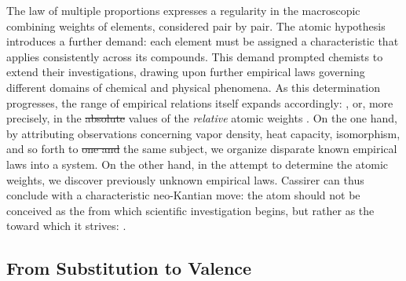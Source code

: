 \documentclass[submitted,12pt]{article}
\providecommand{\DIFadd}[1]{{\protect\color{blue}\uwave{#1}}} %
\providecommand{\DIFdel}[1]{{\protect\color{red}\sout{#1}}}                      %
\providecommand{\DIFaddbegin}{} %
\providecommand{\DIFaddend}{} %
\providecommand{\DIFdelbegin}{} %
\providecommand{\DIFdelend}{} %
\begin{document}
The law of multiple proportions expresses a regularity in the macroscopic combining weights of elements, considered pair by pair. The atomic hypothesis introduces a further demand: each element must be assigned a characteristic  that applies consistently across its compounds. This demand prompted chemists to extend their investigations, drawing upon further empirical laws governing different domains of chemical and physical phenomena. As this determination progresses, the range of empirical relations itself expands accordingly: \DIFdelbegin %
\DIFdelend \DIFaddbegin {}\DIFaddend , or, more precisely, in the \DIFdelbegin \DIFdel{absolute }\DIFdelend \DIFaddbegin \DIFadd{determinate }\DIFaddend values of the \emph{relative} atomic weights . On the one hand, by attributing observations concerning vapor density, heat capacity, isomorphism, and so forth to \DIFdelbegin \DIFdel{one and }\DIFdelend the same subject, we organize disparate known empirical laws into a system. On the other hand, in the attempt to determine the atomic weights, we discover previously unknown empirical laws. Cassirer can thus conclude with a characteristic neo-Kantian move: the atom should not be conceived as the  from which scientific investigation begins, but rather as the  toward which it strives:  .  

\subsection{From Substitution to Valence}
\end{document}
